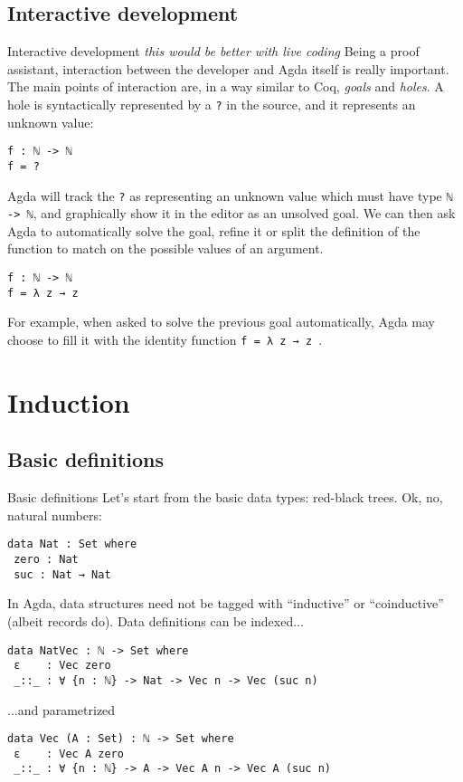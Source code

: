 \documentclass[t,aspectratio=169,9pt]{beamer}
\begin{document}
\subsection[inter-dev]{Interactive development}
\begin{frame}[fragile]{Interactive development}
{\small \it this would be better with live coding}
\vfill
Being a proof assistant, interaction between the developer and Agda itself is
really important. The main points of interaction are, in a way similar to Coq,
\textit{goals} and \textit{holes}. A hole is syntactically represented by a
\texttt{?} in the source, and it represents an unknown value:
\begin{verbatim}
f : ℕ -> ℕ
f = ?
\end{verbatim}
Agda will track the \texttt{?} as representing an unknown value which must have type
\texttt{ℕ -> ℕ}, and graphically show it in the editor as an unsolved
goal. We can then ask Agda to automatically solve the goal, refine it or split
the definition of the function to match on the possible values of an argument.
\begin{verbatim}
f : ℕ -> ℕ
f = λ z → z
\end{verbatim}
For example, when asked to solve the previous goal automatically, Agda may
choose to fill it with the identity function \texttt{f = λ z → z }.
\vfill
\end{frame}

\section[induction]{Induction}
\subsection[induction]{Basic definitions}
\begin{frame}[fragile]{Basic definitions}
  Let's start from the basic data types: red-black trees. Ok, no, natural numbers:
\begin{verbatim}
data Nat : Set where
 zero : Nat
 suc : Nat → Nat
\end{verbatim}
  In Agda, data structures need not be tagged with ``inductive'' or
  ``coinductive'' (albeit records do).
  Data definitions can be indexed...
\begin{verbatim}
data NatVec : ℕ -> Set where
 ε    : Vec zero
 _::_ : ∀ {n : ℕ} -> Nat -> Vec n -> Vec (suc n)
\end{verbatim}
...and parametrized
\begin{verbatim}
data Vec (A : Set) : ℕ -> Set where
 ε    : Vec A zero
 _::_ : ∀ {n : ℕ} -> A -> Vec A n -> Vec A (suc n)
\end{verbatim}
\end{frame}
\end{document}
